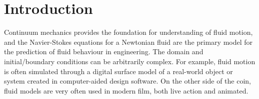 
\vskip -0.2in %
\section{Introduction}

Continuum mechanics provides the foundation for understanding of fluid motion, and the Navier-Stokes equations for
a Newtonian fluid are the primary model for the prediction of fluid behaviour in engineering.
The domain and initial/boundary conditions can be arbitrarily complex. For example, fluid motion is often simulated
through a digital surface model of a real-world object or system created in computer-aided design software.
On the other side of the coin, fluid models are very often used in modern film, both live action and animated.
\captionsetup[subfigure]{labelformat=empty}
